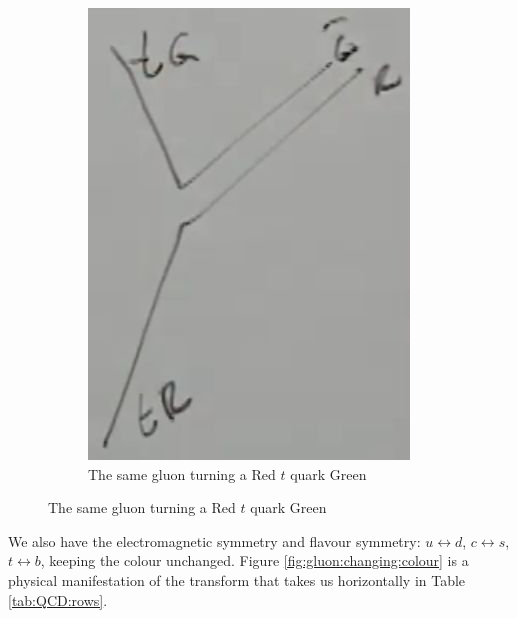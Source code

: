 \documentclass[]{article}
\begin{document}
\begin{figure}[H]
	\hfill
	\begin{subfigure}[t]{0.45\textwidth}
		\caption{The same gluon turning a Red $t$ quark Green}
		\includegraphics[width=\textwidth]{particles2-5-gluon-t}
	\end{subfigure}
\end{figure}
 
We also have the electromagnetic symmetry and flavour symmetry: $u\leftrightarrow d$, $c\leftrightarrow s$, $t\leftrightarrow b$, keeping the colour unchanged. Figure \ref{fig:gluon:changing:colour} is a physical manifestation of the transform that takes us horizontally in Table \ref{tab:QCD:rows}.
\end{document}
